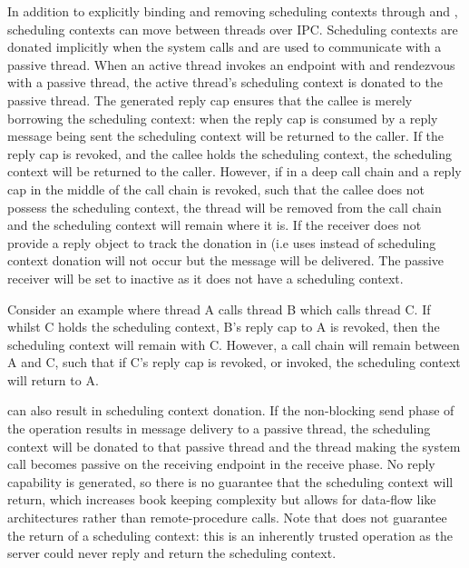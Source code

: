 In addition to explicitly binding and removing scheduling contexts through
 and
, scheduling contexts can move
between threads over IPC.  Scheduling contexts are donated implicitly when the system calls
 and  are used to
communicate with a passive thread.  When an active thread invokes an endpoint with
 and rendezvous with a passive thread, the active thread's scheduling
context is donated to the passive thread. The generated reply cap ensures that the callee is merely
borrowing the scheduling context: when the reply cap is consumed by a reply message being sent the
scheduling context will be returned to the caller.  If the reply cap is revoked, and the callee
holds the scheduling context, the scheduling context will be returned to the caller.  However, if in
a deep call chain and a reply cap in the middle of the call chain is revoked, such that the callee
does not possess the scheduling context, the thread will be removed from the call chain and the
scheduling context will remain where it is.  If the receiver does not provide a reply object to
track the donation in (i.e uses  instead of
 scheduling context donation will not occur but the message will be
delivered. The passive receiver will be set to inactive as it does not have a scheduling context.

Consider an example where thread A calls thread B which calls thread C.  If whilst C holds the
scheduling context, B's reply cap to A is revoked, then the scheduling context will remain with C.
However, a call chain will remain between A and C, such that if C's reply cap is revoked, or
invoked, the scheduling context will return to A.

 can also result in scheduling context donation.
If the non-blocking send phase of the operation results in message delivery to a passive thread, the
scheduling context will be donated to that passive thread and the thread making the system call becomes passive on the
receiving endpoint in the receive phase.  No reply capability is generated, so there
is no guarantee that the scheduling context will return, which increases book keeping complexity but allows
for data-flow like architectures rather than remote-procedure calls. Note that 
does not guarantee the return of a scheduling context: this is an inherently trusted operation as the
server could never reply and return the scheduling context.

